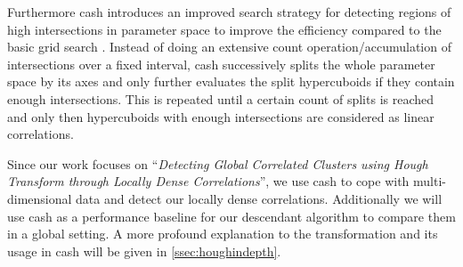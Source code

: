 Furthermore \gls{cash} introduces an improved search strategy for detecting regions of high intersections in parameter space to improve the efficiency compared to the basic grid search \cite{CASHachtert2008global}. Instead of doing an extensive count operation/accumulation of intersections over a fixed interval, \gls{cash} successively splits the whole parameter space by its axes and only further evaluates the split hypercuboids if they contain enough intersections. This is repeated until a certain count of splits is reached and only then hypercuboids with enough intersections are considered as linear correlations. 

Since our work focuses on ``\textit{Detecting Global Correlated Clusters using Hough Transform through Locally Dense Correlations}'', we use \gls{cash} to cope with multi-dimensional data and detect our locally dense correlations. Additionally we will use \gls{cash} as a performance baseline for our descendant algorithm to compare them in a global setting.
A more profound explanation to the transformation and its usage in \gls{cash} will be given in \autoref{ssec:houghindepth}.

